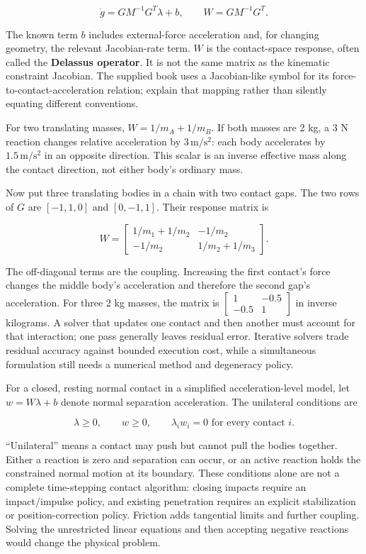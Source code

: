 \[
\ddot g=G M^{-1}G^T\lambda+b,
\qquad W=G M^{-1}G^T.
\]

The known term \(b\) includes external-force acceleration and, for changing geometry, the relevant Jacobian-rate term. \(W\) is the contact-space response, often called the \textbf{Delassus operator}. It is not the same matrix as the kinematic constraint Jacobian. The supplied book uses a Jacobian-like symbol for its force-to-contact-acceleration relation; explain that mapping rather than silently equating different conventions.

For two translating masses, \(W=1/m_A+1/m_B\). If both masses are 2 kg, a 3 N reaction changes relative acceleration by \(3\,\mathrm{m/s^2}\): each body accelerates by \(1.5\,\mathrm{m/s^2}\) in an opposite direction. This scalar is an inverse effective mass along the contact direction, not either body's ordinary mass.

Now put three translating bodies in a chain with two contact gaps. The two rows of \(G\) are \([-1,1,0]\) and \([0,-1,1]\). Their response matrix is

\[
W=\begin{bmatrix}
1/m_1+1/m_2 & -1/m_2\\
-1/m_2 & 1/m_2+1/m_3
\end{bmatrix}.
\]

The off-diagonal terms are the coupling. Increasing the first contact's force changes the middle body's acceleration and therefore the second gap's acceleration. For three 2 kg masses, the matrix is \(\begin{bmatrix}1&-0.5\\-0.5&1\end{bmatrix}\) in inverse kilograms. A solver that updates one contact and then another must account for that interaction; one pass generally leaves residual error. Iterative solvers trade residual accuracy against bounded execution cost, while a simultaneous formulation still needs a numerical method and degeneracy policy.

For a closed, resting normal contact in a simplified acceleration-level model, let \(w=W\lambda+b\) denote normal separation acceleration. The unilateral conditions are

\[
\lambda\ge0,\qquad w\ge0,\qquad \lambda_i w_i=0\text{ for every contact }i.
\]

``Unilateral'' means a contact may push but cannot pull the bodies together. Either a reaction is zero and separation can occur, or an active reaction holds the constrained normal motion at its boundary. These conditions alone are not a complete time-stepping contact algorithm: closing impacts require an impact/impulse policy, and existing penetration requires an explicit stabilization or position-correction policy. Friction adds tangential limits and further coupling. Solving the unrestricted linear equations and then accepting negative reactions would change the physical problem.

